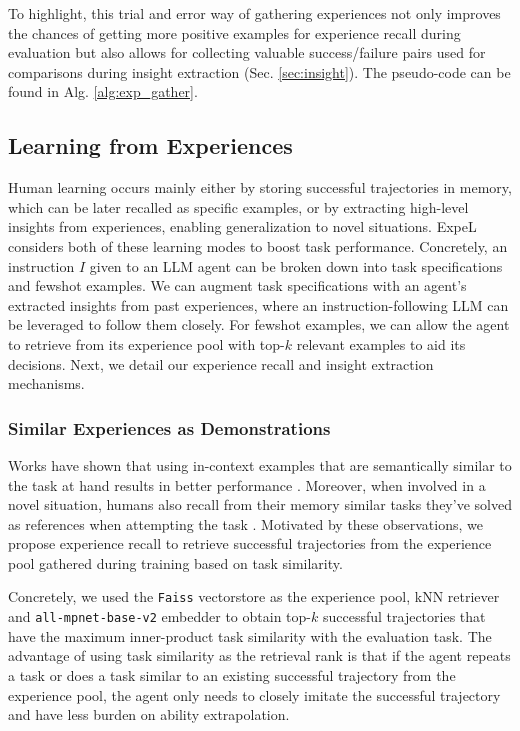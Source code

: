\documentclass[letterpaper]{article} %
\begin{document}
To highlight, this trial and error way of gathering experiences not only improves the chances of getting more positive examples for experience recall during evaluation but also allows for collecting valuable success/failure pairs used for comparisons during insight extraction (Sec. \ref{sec:insight}). The pseudo-code can be found in Alg. \ref{alg:exp_gather}.

\subsection{Learning from Experiences}
Human learning occurs mainly either by storing successful trajectories in memory, which can be later recalled as specific examples, or by extracting high-level insights from experiences, enabling generalization to novel situations. ExpeL considers both of these learning modes to boost task performance. Concretely, an instruction $I$ given to an LLM agent can be broken down into task specifications and fewshot examples. We can augment task specifications with an agent's extracted insights from past experiences, where an instruction-following LLM can be leveraged \cite{openai2023gpt4} to follow them closely. For fewshot examples, we can allow the agent to retrieve from its experience pool with top-$k$ relevant examples to aid its decisions. Next, we detail our experience recall and insight extraction mechanisms.

\subsubsection{Similar Experiences as Demonstrations}
\label{sec:recollection}

Works have shown that using in-context examples that are semantically similar to the task at hand results in better performance \cite{liu2021makes}. Moreover, when involved in a novel situation, humans also recall from their memory similar tasks they've solved as references when attempting the task \cite{kahneman2011thinking}. Motivated by these observations, we propose experience recall to retrieve successful trajectories from the experience pool gathered during training based on task similarity.

Concretely, we used the \texttt{Faiss} vectorstore \cite{johnson2019billion} as the experience pool, kNN retriever and \texttt{all-mpnet-base-v2} \cite{song2020mpnet} embedder to obtain top-$k$ successful trajectories that have the maximum inner-product task similarity with the evaluation task. The advantage of using task similarity as the retrieval rank is that if the agent repeats a task or does a task similar to an existing successful trajectory from the experience pool, the agent only needs to closely imitate the successful trajectory and have less burden on ability extrapolation.
\end{document}
